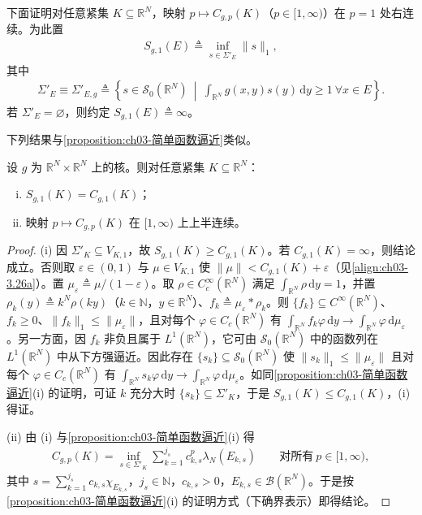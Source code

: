 \documentclass[../../main.tex]{subfiles}%
\begin{document}
下面证明对任意紧集 $K\subseteq\mathbb{R}^N$，映射 $p\mapsto C_{g,p}(K)$（$p\in[1,\infty)$）在 $p=1$ 处右连续。为此置
\begin{align}
S_{g,1}(E)\triangleq\inf_{s\in\Sigma'_E}\|s\|_1,\label{align:ch03-3.39a}
\end{align}
其中
\begin{align}
\Sigma'_E\equiv\Sigma'_{E,g}\triangleq\left\{s\in\mathscr S_0(\mathbb{R}^N)\ \middle|\ \int_{\mathbb{R}^N}g(x,y)s(y)\,\mathrm{d}y\geqslant1\ \forall x\in E\right\}.\label{align:ch03-3.39b}
\end{align}
若 $\Sigma'_E=\varnothing$，则约定 $S_{g,1}(E)\triangleq\infty$。

下列结果与\cref{proposition:ch03-简单函数逼近}类似。

\begin{proposition}\label{proposition:ch03-容量p1表示}
设 $g$ 为 $\mathbb{R}^N\times\mathbb{R}^N$ 上的核。则对任意紧集 $K\subseteq\mathbb{R}^N$：
\begin{enumerate}[(i)]
\item $S_{g,1}(K)=C_{g,1}(K)$；
\item 映射 $p\mapsto C_{g,p}(K)$ 在 $[1,\infty)$ 上上半连续。
\end{enumerate}
\end{proposition}

\begin{proof}
(i) 因 $\Sigma'_K\subseteq V_{K,1}$，故 $S_{g,1}(K)\geqslant C_{g,1}(K)$。若 $C_{g,1}(K)=\infty$，则结论成立。否则取 $\varepsilon\in(0,1)$ 与 $\mu\in V_{K,1}$ 使 $\|\mu\|<C_{g,1}(K)+\varepsilon$（见\eqref{align:ch03-3.26a}）。置 $\mu_\varepsilon\triangleq\mu/(1-\varepsilon)$。取 $\rho\in C_c^\infty(\mathbb{R}^N)$ 满足 $\int_{\mathbb{R}^N}\rho\,\mathrm{d}y=1$，并置 $\rho_k(y)\triangleq k^N\rho(ky)$（$k\in\mathbb{N}$，$y\in\mathbb{R}^N$）、$f_k\triangleq\mu_\varepsilon*\rho_k$。则 $\{f_k\}\subseteq C^\infty(\mathbb{R}^N)$、$f_k\geqslant0$、$\|f_k\|_1\leqslant\|\mu_\varepsilon\|$，且对每个 $\varphi\in C_c(\mathbb{R}^N)$ 有 $\int_{\mathbb{R}^N}f_k\varphi\,\mathrm{d}y\to\int_{\mathbb{R}^N}\varphi\,\mathrm{d}\mu_\varepsilon$。另一方面，因 $f_k$ 非负且属于 $L^1(\mathbb{R}^N)$，它可由 $\mathscr S_0(\mathbb{R}^N)$ 中的函数列在 $L^1(\mathbb{R}^N)$ 中从下方强逼近。因此存在 $\{s_k\}\subseteq\mathscr S_0(\mathbb{R}^N)$ 使 $\|s_k\|_1\leqslant\|\mu_\varepsilon\|$ 且对每个 $\varphi\in C_c(\mathbb{R}^N)$ 有 $\int_{\mathbb{R}^N}s_k\varphi\,\mathrm{d}y\to\int_{\mathbb{R}^N}\varphi\,\mathrm{d}\mu_\varepsilon$。如同\cref{proposition:ch03-简单函数逼近}(i) 的证明，可证 $k$ 充分大时 $\{s_k\}\subseteq\Sigma'_K$，于是 $S_{g,1}(K)\leqslant C_{g,1}(K)$，(i) 得证。

(ii) 由 (i) 与\cref{proposition:ch03-简单函数逼近}(i) 得
\begin{align*}
C_{g,p}(K)=\inf_{s\in\Sigma'_K}\sum_{k=1}^{j_s}c_{k,s}^p\lambda_N(E_{k,s})\qquad\text{对所有}\ p\in[1,\infty),
\end{align*}
其中 $s=\sum_{k=1}^{j_s}c_{k,s}\chi_{E_{k,s}}$，$j_s\in\mathbb{N}$，$c_{k,s}>0$，$E_{k,s}\in\mathcal{B}(\mathbb{R}^N)$。于是按\cref{proposition:ch03-简单函数逼近}(i) 的证明方式（下确界表示）即得结论。
\end{proof}
\end{document}
